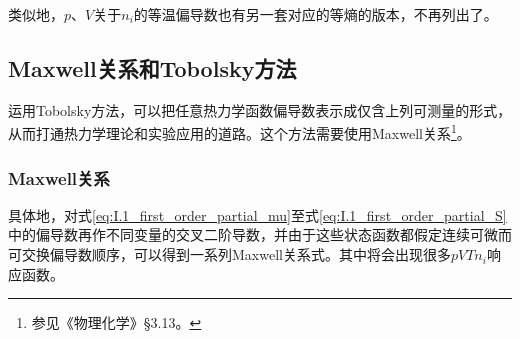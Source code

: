 \documentclass[main.tex]{subfiles}
\begin{document}
类似地，$p$、$V$关于$n_i$的等温偏导数也有另一套对应的等熵的版本，不再列出了。

\subsection{Maxwell关系和Tobolsky方法}
运用Tobolsky方法\cite{Tobolsky1942}，可以把任意热力学函数偏导数表示成仅含上列可测量的形式，从而打通热力学理论和实验应用的道路。这个方法需要使用Maxwell关系\footnote{参见《物理化学》\S 3.13。}。

\subsubsection{Maxwell关系}
具体地，对式\eqref{eq:I.1_first_order_partial_mu}至式\eqref{eq:I.1_first_order_partial_S}中的偏导数再作不同变量的交叉二阶导数，并由于这些状态函数都假定连续可微而可交换偏导数顺序，可以得到一系列Maxwell关系式。其中将会出现很多$pVTn_i$响应函数。
\end{document}
